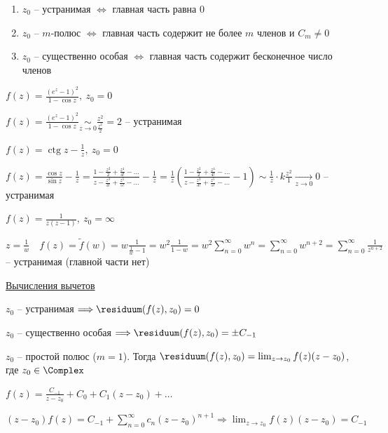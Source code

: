 \documentclass[12pt]{article}
\begin{document}
\begin{enumerate}
    \item $z_0$ -- устранимая $\Longleftrightarrow$ главная часть равна 0
    \item $z_0$ -- $m$-полюс $\Longleftrightarrow$ главная часть содержит не более $m$ членов и $C_m \neq 0$
    \item $z_0$ -- существенно особая $\Longleftrightarrow$ главная часть содержит бесконечное число членов
\end{enumerate}

 $f(z) = \frac{(e^z - 1)^2}{1 - \cos z}, \ z_0 = 0$

$f(z) = \frac{(e^z - 1)^2}{1 - \cos z} \underset{z \to 0}{\sim} \frac{z^2}{\frac{z^2}{2}} = 2$ -- устранимая

 $f(z) = \operatorname{ctg} z - \frac{1}{z}, \ z_0 = 0$

$f(z) = \frac{\cos z}{\sin z} - \frac{1}{z} = \frac{1 - \frac{z^2}{2} + \frac{z^4}{4!} - \dots}{z - \frac{z^3}{3!} + \frac{z^5}{5!} - \dots} - \frac{1}{z} = \frac{1}{z} \left(\frac{1 - \frac{z^2}{2} + \frac{z^4}{4!} - \dots}{z - \frac{z^3}{3!} + \frac{z^5}{5!} - \dots} - 1\right) \sim \frac{1}{z} \cdot k \frac{z^2}{1} \underset{z \to 0}{\longrightarrow} 0$ -- устранимая

 $f(z) = \frac{1}{z(z - 1)}, \ z_0 = \infty$

$z = \frac{1}{w} \quad f(z) = \tilde f(w) = w \frac{1}{\frac{1}{w} - 1} = w^2 \frac{1}{1 - w} = w^2 \sum_{n = 0}^\infty w^n = \sum_{n = 0}^\infty w^{n + 2} = \sum_{n = 0}^\infty \frac{1}{z^{n + 2}}$ -- устранимая (главной части нет)

\mediumvspace

\underline{Вычисления вычетов}

\Nota $z_0$ -- устранимая $\Longrightarrow \residuum(f(z), z_0) = 0$

$z_0$ -- существенно особая $\Longrightarrow \residuum(f(z), z_0) = \pm C_{-1}$

\begin{MyTheorem}
    \Ths $z_0$ -- простой полюс ($m = 1$). Тогда $\residuum(f(z), z_0) = \lim_{z \to z_0} f(z) (z - z_0)$, где $z_0 \in \Complex$
\end{MyTheorem}

\begin{MyProof}
    $f(z) = \frac{C_{-1}}{z - z_0} + C_0 + C_1 (z - z_0) + \dots$

    $(z - z_0) f(z) = C_{-1} + \sum_{n = 0}^\infty c_n (z - z_0)^{n + 1} \Longrightarrow \lim_{z \to z_0} f(z) (z - z_0) = C_{-1}$
\end{MyProof}
\end{document}

